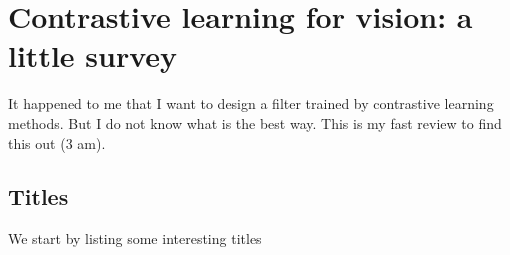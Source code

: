 \documentclass[
]{article}
\author{}
\date{}
\begin{document}
\hypertarget{contrastive-learning-for-vision-a-little-survey}{%
\section{Contrastive learning for vision: a little
survey}\label{contrastive-learning-for-vision-a-little-survey}}

It happened to me that I want to design a filter trained by contrastive
learning methods. But I do not know what is the best way. This is my
fast review to find this out (3 am).

\hypertarget{titles}{%
\subsection{Titles}\label{titles}}

We start by listing some interesting titles
\end{document}
